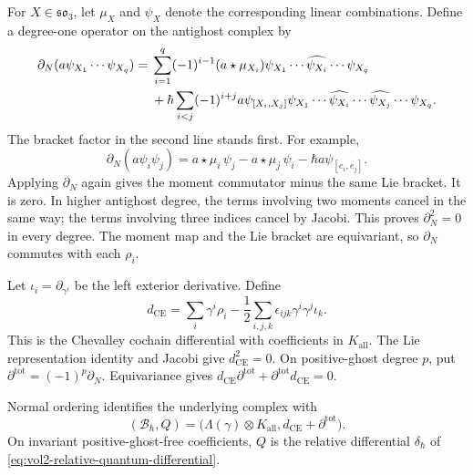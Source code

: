 For $X\in\mathfrak{so}_3$, let $\mu_X$ and $\psi_X$ denote
the corresponding linear combinations. Define a degree-one
operator on the antighost complex by
\begin{align}\label{eq:vol2-absolute-chain}
 \partial_N(a\psi_{X_1}\cdots\psi_{X_q})
 ={}&\sum_{i=1}^q(-1)^{i-1}(a\star\mu_{X_i})
     \psi_{X_1}\cdots\widehat{\psi_{X_i}}\cdots\psi_{X_q}
       \notag\\
 &+\hbar\sum_{i<j}(-1)^{i+j}a\psi_{[X_i,X_j]}
     \psi_{X_1}\cdots\widehat{\psi_{X_i}}\cdots
                       \widehat{\psi_{X_j}}\cdots\psi_{X_q}.
\end{align}
The bracket factor in the second line stands first.
For example,
\[
 \partial_N(a\psi_i\psi_j)
 =a\star\mu_i\,\psi_j-a\star\mu_j\,\psi_i
          -\hbar a\psi_{[e_i,e_j]}.
\]
Applying $\partial_N$ again gives the moment commutator minus
the same Lie bracket. It is zero. In higher antighost degree,
the terms involving two moments cancel in the same way;
the terms involving three indices cancel by Jacobi.
This proves $\partial_N^2=0$ in every degree.
The moment map and the Lie bracket are equivariant, so
$\partial_N$ commutes with each $\rho_i$.

Let $\iota_i=\partial_{\gamma^i}$ be the left exterior
derivative. Define
\begin{equation}\label{eq:vol2-absolute-chevalley}
 d_{\mathrm{CE}}=\sum_i\gamma^i\rho_i
       -\frac12\sum_{i,j,k}\epsilon_{ijk}
                     \gamma^i\gamma^j\iota_k.
\end{equation}
This is the Chevalley cochain differential with coefficients in
$K_{\mathrm{all}}$. The Lie representation identity and Jacobi
give $d_{\mathrm{CE}}^2=0$.
On positive-ghost degree $p$, put
$\partial^{\mathrm{tot}}=(-1)^p\partial_N$.
Equivariance gives
$d_{\mathrm{CE}}\partial^{\mathrm{tot}}
 +\partial^{\mathrm{tot}}d_{\mathrm{CE}}=0$.

\begin{lemma}\label{lem:vol2-absolute-normal-order}
Normal ordering identifies the underlying complex with
\begin{equation}\label{eq:vol2-absolute-bicomplex}
 (\mathcal B_\hbar,Q)
  =\bigl(\Lambda(\gamma)\otimes K_{\mathrm{all}},
          d_{\mathrm{CE}}+\partial^{\mathrm{tot}}\bigr).
\end{equation}
On invariant positive-ghost-free coefficients, $Q$ is the
relative differential $\delta_\hbar$ of
\eqref{eq:vol2-relative-quantum-differential}.
\end{lemma}

